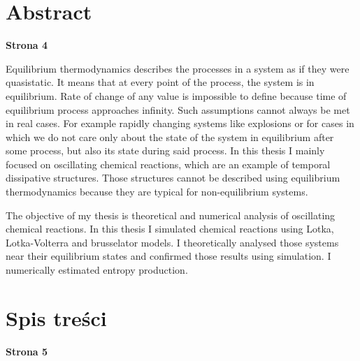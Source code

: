 \documentclass[10pt, a4paper, twoside, onecolumn]{article}
\numberwithin{equation}{section}
\begin{document}
	\pagebreak
	
	\section*{Abstract}
	\begin{center}
		\textbf{Strona 4}
	\end{center}
	Equilibrium thermodynamics describes the processes in a system as if they were quasistatic. It means that at every point of the process, the system is in equilibrium. Rate of change of any value is impossible to define because time of equilibrium process approaches infinity. Such assumptions cannot always be met in real cases. For example rapidly changing systems like explosions or for cases in which we do not care only about the state of the system in equilibrium after some process, but also its state during said process. In this thesis I mainly focused on oscillating chemical reactions, which are an example of temporal dissipative structures. Those structures cannot be described using equilibrium thermodynamics because they are typical for non-equilibrium systems. \par
	The objective of my thesis is theoretical and numerical analysis of oscillating chemical reactions. In this thesis I simulated chemical reactions using Lotka, Lotka-Volterra and brusselator models. I theoretically analysed those systems near their equilibrium states and confirmed those results using simulation. I numerically estimated entropy production. 
	\pagebreak
	
	\section*{Spis treści}
	\begin{center}
		\textbf{Strona 5}
	\end{center}
	\tableofcontents
	\pagebreak
	
\end{document}
